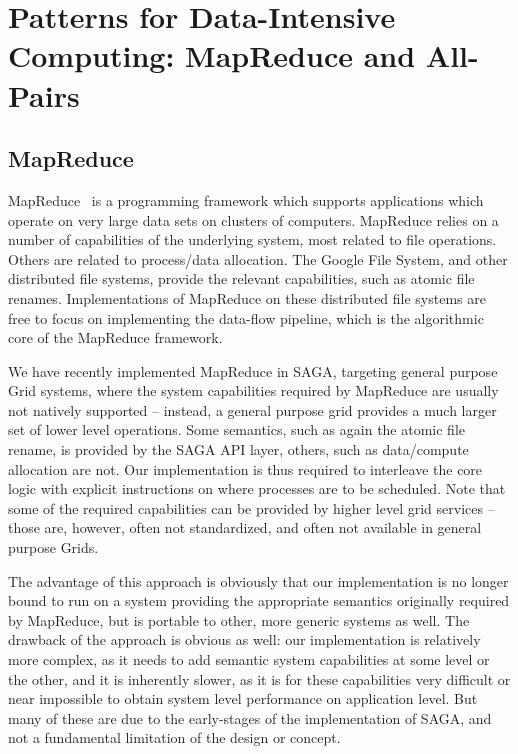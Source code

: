 \documentclass[conference,final]{IEEEtran}
\begin{document}
\section{Patterns for Data-Intensive Computing: MapReduce and
  All-Pairs}

\subsection{MapReduce}

MapReduce~\cite{mapreduce-paper} is a programming framework which
supports applications which operate on very large data sets on
clusters of computers.  MapReduce relies on a number of capabilities
of the underlying system, most related to file operations.  Others are 
related to process/data allocation.  The Google File System, and other
distributed file systems, provide the relevant capabilities, such as atomic
file renames.  Implementations of MapReduce on these distributed file systems
are free to focus on implementing the data-flow pipeline, which is the
algorithmic core of the MapReduce framework.

We have recently implemented MapReduce in SAGA, targeting general
purpose Grid systems, where the system capabilities required by
MapReduce are usually not natively supported -- instead, a general
purpose grid provides a much larger set of lower level operations.
Some semantics, such as again the atomic file rename, is provided by
the SAGA API layer, others, such as data/compute allocation are not.
Our implementation is thus required to interleave the core logic with
explicit instructions on where processes are to be scheduled.  Note
that some of the required capabilities can be provided by higher level
grid services -- those are, however, often not standardized, and often
not available in general purpose Grids.

The advantage of this approach is obviously that our implementation is
no longer bound to run on a system providing the appropriate semantics
originally required by MapReduce, but is portable to other, more
generic systems as well.  The drawback of the approach is obvious as
well: our implementation is relatively more complex, as it needs to
add semantic system capabilities at some level or the other, and it is
inherently slower, as it is for these capabilities very difficult or
near impossible to obtain system level performance on application
level.  But many of these are due to the early-stages of the
implementation of SAGA, and not a fundamental limitation of the design
or concept.
\end{document}
